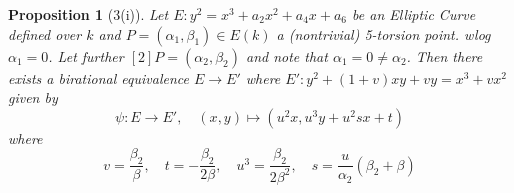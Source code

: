 \documentclass{scrartcl}
\newtheorem{prop}{Proposition}
\theoremstyle{definition}
\begin{document}
\begin{prop}[3(i)]
    Let $E: y^2 = x^3 + a_2 x^2 + a_4 x + a_6$ be an Elliptic Curve defined over $k$ and $P = (\alpha_1, \beta_1) \in E(k)$ a (nontrivial) 5-torsion point.
    wlog $\alpha_1 = 0$.
    Let further $[2]P = (\alpha_2, \beta_2)$ and note that $\alpha_1 = 0 \neq \alpha_2$.
    Then there exists a birational equivalence $E \to E'$ where $E': y^2 + (1 + v) x y + v y = x^3 + v x^2$ given by
    \begin{equation*}
        \psi: E \to E', \quad (x, y) \mapsto (u^2 x, u^3 y + u^2 s x + t)
    \end{equation*}
    where
    \begin{equation*}
        v = \frac {\beta_2} {\beta}, \quad t = -\frac {\beta_2} {2\beta}, \quad u^3 = \frac {\beta_2} {2\beta^2}, \quad s = \frac {u} {\alpha_2} ( \beta_2 + \beta )
    \end{equation*}
\end{prop}
\end{document}
